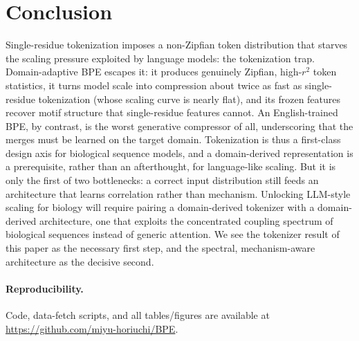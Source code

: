 \documentclass[11pt]{article}
\begin{document}
\section{Conclusion}
Single-residue tokenization imposes a non-Zipfian token distribution that starves
the scaling pressure exploited by language models: the tokenization trap.
Domain-adaptive BPE escapes it: it produces genuinely Zipfian, high-$r^2$ token
statistics, it turns model scale into compression about twice as fast as
single-residue tokenization (whose scaling curve is nearly flat), and its frozen
features recover motif structure that single-residue features cannot. An
English-trained BPE, by contrast, is the worst generative compressor of all,
underscoring that the merges must be learned on the target domain. Tokenization
is thus a first-class design axis for biological sequence models, and a
domain-derived representation is a prerequisite, rather than an afterthought, for
language-like scaling. But it is only the first of two bottlenecks: a correct
input distribution still feeds an architecture that learns correlation rather
than mechanism. Unlocking LLM-style scaling for biology will require pairing a
domain-derived tokenizer with a domain-derived architecture, one that exploits
the concentrated coupling spectrum of biological sequences instead of generic
attention. We see the tokenizer result of this paper as the necessary first step,
and the spectral, mechanism-aware architecture as the decisive second.

\paragraph{Reproducibility.} Code, data-fetch scripts, and all tables/figures are
available at \url{https://github.com/miyu-horiuchi/BPE}.
\end{document}
